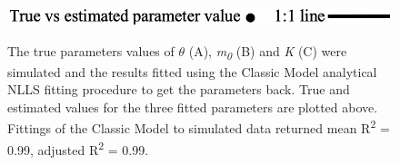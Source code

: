 {\begin{figure}[htbp]
\centering
{}
\smallskip

\includegraphics[width=.6\textwidth]{Legend2.png}\\
\caption{The true parameters values of $\theta$ (A), \textit{m\textsubscript{0}} (B) and \textit{K} (C) were simulated and the results fitted using the Classic Model analytical NLLS fitting procedure to get the parameters back. True and estimated values for the three fitted parameters are plotted above. Fittings of the Classic Model to simulated data returned mean R\textsuperscript{2} = 0.99, adjusted R\textsuperscript{2} = 0.99.}
\label{fig:myfig}
\end{figure}

}
